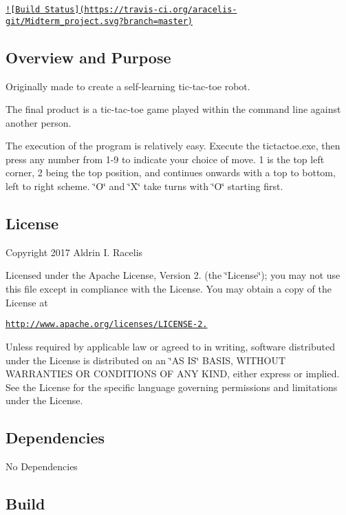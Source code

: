 \href{https://travis-ci.org/aracelis-git/Midterm_project}{\tt !\mbox{[}Build Status\mbox{]}(https\-://travis-\/ci.\-org/aracelis-\/git/\-Midterm\-\_\-project.\-svg?branch=master)} 



\subsection*{Overview and Purpose}

Originally made to create a self-\/learning tic-\/tac-\/toe robot.

The final product is a tic-\/tac-\/toe game played within the command line against another person.

The execution of the program is relatively easy. Execute the tictactoe.\-exe, then press any number from 1-\/9 to indicate your choice of move. 1 is the top left corner, 2 being the top position, and continues onwards with a top to bottom, left to right scheme. \char`\"{}\-O\char`\"{} and \char`\"{}\-X\char`\"{} take turns with \char`\"{}\-O\char`\"{} starting first.

\subsection*{License}

Copyright 2017 Aldrin I. Racelis

Licensed under the Apache License, Version 2. (the \char`\"{}\-License\char`\"{}); you may not use this file except in compliance with the License. You may obtain a copy of the License at

\href{http://www.apache.org/licenses/LICENSE-2.0}{\tt http\-://www.\-apache.\-org/licenses/\-L\-I\-C\-E\-N\-S\-E-\/2.}

Unless required by applicable law or agreed to in writing, software distributed under the License is distributed on an \char`\"{}\-A\-S I\-S\char`\"{} B\-A\-S\-I\-S, W\-I\-T\-H\-O\-U\-T W\-A\-R\-R\-A\-N\-T\-I\-E\-S O\-R C\-O\-N\-D\-I\-T\-I\-O\-N\-S O\-F A\-N\-Y K\-I\-N\-D, either express or implied. See the License for the specific language governing permissions and limitations under the License.

\subsection*{Dependencies}

No Dependencies

\subsection*{Build}

